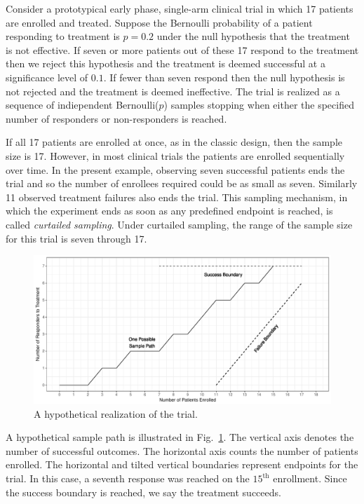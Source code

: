 \documentclass[12pt]{article}
\begin{document}
Consider a prototypical early phase, single-arm clinical trial in which 
17 patients
are enrolled and treated. Suppose the Bernoulli probability of a patient 
responding to treatment is $p=0.2$ 
under the null hypothesis that the treatment is not effective.
If seven or more patients out of these 17 respond to the treatment then we 
reject this hypothesis and the treatment is deemed successful at 
a significance level of $0.1$.  If fewer than seven respond then the null 
hypothesis is not 
rejected and the treatment is deemed ineffective. The trial is 
realized as a sequence of indiependent Bernoulli($p$) samples stopping when 
either the specified number of responders or non-responders is reached.

If all 17 patients are enrolled at once, as in the classic
design, then the sample size is 17. However, in most clinical trials the
patients are enrolled sequentially over time.
In the present example, observing seven
successful patients ends the trial and so the number of enrollees required
could be as small as seven. Similarly 11
observed treatment failures also ends the trial. This sampling mechanism, in
which the experiment ends as soon as any predefined endpoint is reached, is
called {\em curtailed sampling}. Under curtailed sampling, the range of the
sample size for this trial is seven through 17.

\begin{figure}[bp!]
\centering
\includegraphics[width=\textwidth]{KanePlot.pdf}
\caption{
A hypothetical realization of the trial.
}
\label{fig:kane_viz}
\end{figure}

A hypothetical sample path is illustrated in Fig.~\ref{fig:kane_viz}.
The vertical axis denotes the number of
successful outcomes. The horizontal axis counts the number of patients 
enrolled. The horizontal and tilted vertical boundaries represent
endpoints for the trial. In this case, a seventh response was reached on
the $15^{\text{th}}$ enrollment.
Since the success boundary is reached, we say the treatment succeeds.
\end{document}
